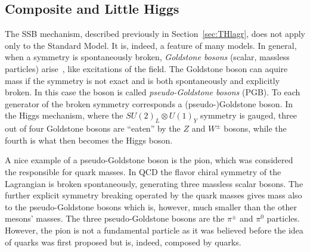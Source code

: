 \subsection{Composite and Little Higgs}\label{sec:littlehiggs}

The SSB mechanism, described previously in Section~\ref{sec:THlagr},
does not apply only to the Standard Model. It is, indeed,
a feature of many models. In general, when a symmetry is
spontaneously broken, {\it Goldstone bosons} (scalar, massless particles)
arise~\cite{PhysRev.127.965}, like excitations of the field.
The Goldstone boson can aquire mass if the symmetry is not exact
and is both spontaneously and explicitly broken. In this case
the boson is called {\it pseudo-Goldstone bosons} (PGB).
To each generator of the broken symmetry corresponds a
(pseudo-)Goldstone boson. In the Higgs mechanism, where the
$SU(2)_L\otimes U(1)_Y$ symmetry is gauged, three out of four
Goldstone bosons are ``eaten'' by the $Z$ and $W^{\pm}$
bosons, while the fourth is what then becomes the Higgs boson.

A nice example of a pseudo-Goldstone boson is the pion,
which was considered the responsible for quark masses. 
In QCD the flavor chiral symmetry of the Lagrangian is 
broken spontaneously, generating three
massless scalar bosons. The further explicit symmetry breaking
operated by the quark masses gives mass also to the 
pseudo-Goldstone bosons which is, however, much smaller than
the other mesons' masses. The three pseudo-Goldstone bosons 
are the $\pi^{\pm}$ and $\pi^0$ particles. %
However, the pion is not a fundamental particle as
it was believed before the idea of quarks was first
proposed but is, indeed, composed by quarks. 



